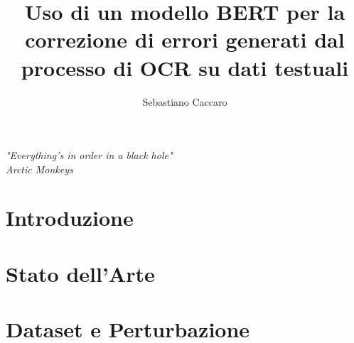 \documentclass[a4paper,12pt,twoside,openright]{report}
\begin{document}
\newcommand{\E}{È}
\title{Uso di un modello BERT per la correzione di errori generati dal processo di OCR su dati testuali}
\author{Sebastiano Caccaro}
%
% 
%
\beforepreface
\prefacesection{}
\begin{flushright}
\Large {\sl "Everything's in order in a black hole"}\\
\sl \large Arctic Monkeys
\end{flushright}
% 
%

%
%
%

\afterpreface
% 
% 
\chapter*{Introduzione}
\label{sec:intro}


\chapter{Stato dell'Arte}
\label{sec:arte}


\chapter{Dataset e Perturbazione}
\label{sec:dataset}

\end{document}
